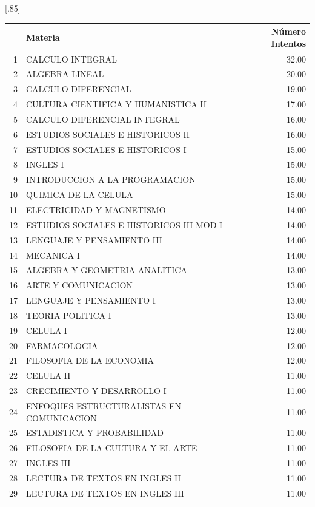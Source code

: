 \documentclass[12pt]{article}
\begin{document}
\begin{table}[ht]
\centering
\scalebox{0.75}[.85]{
\begin{tabular}{rlr}
  \hline
 & Materia & N\'umero Intentos \\ 
  \hline
1 & CALCULO INTEGRAL & 32.00 \\ 
  2 & ALGEBRA LINEAL & 20.00 \\ 
  3 & CALCULO DIFERENCIAL & 19.00 \\ 
  4 & CULTURA CIENTIFICA Y HUMANISTICA II & 17.00 \\ 
  5 & CALCULO DIFERENCIAL INTEGRAL & 16.00 \\ 
  6 & ESTUDIOS SOCIALES E HISTORICOS II  & 16.00 \\ 
  7 & ESTUDIOS SOCIALES E HISTORICOS I & 15.00 \\ 
  8 & INGLES I & 15.00 \\ 
  9 & INTRODUCCION A LA PROGRAMACION & 15.00 \\ 
  10 & QUIMICA DE LA CELULA & 15.00 \\ 
  11 & ELECTRICIDAD Y MAGNETISMO & 14.00 \\ 
  12 & ESTUDIOS SOCIALES E HISTORICOS III MOD-I & 14.00 \\ 
  13 & LENGUAJE Y PENSAMIENTO III & 14.00 \\ 
  14 & MECANICA I & 14.00 \\ 
  15 & ALGEBRA Y GEOMETRIA ANALITICA & 13.00 \\ 
  16 & ARTE Y COMUNICACION & 13.00 \\ 
  17 & LENGUAJE Y PENSAMIENTO I & 13.00 \\ 
  18 & TEORIA POLITICA I & 13.00 \\ 
  19 & CELULA I & 12.00 \\ 
  20 & FARMACOLOGIA & 12.00 \\ 
  21 & FILOSOFIA DE LA ECONOMIA & 12.00 \\ 
  22 & CELULA II & 11.00 \\ 
  23 & CRECIMIENTO Y DESARROLLO I & 11.00 \\ 
  24 & ENFOQUES ESTRUCTURALISTAS EN COMUNICACION & 11.00 \\ 
  25 & ESTADISTICA Y PROBABILIDAD & 11.00 \\ 
  26 & FILOSOFIA DE LA CULTURA Y EL ARTE & 11.00 \\ 
  27 & INGLES III & 11.00 \\ 
  28 & LECTURA DE TEXTOS EN INGLES II & 11.00 \\ 
  29 & LECTURA DE TEXTOS EN INGLES III & 11.00 \\ 

\end{tabular}}
\end{table}
\end{document}
